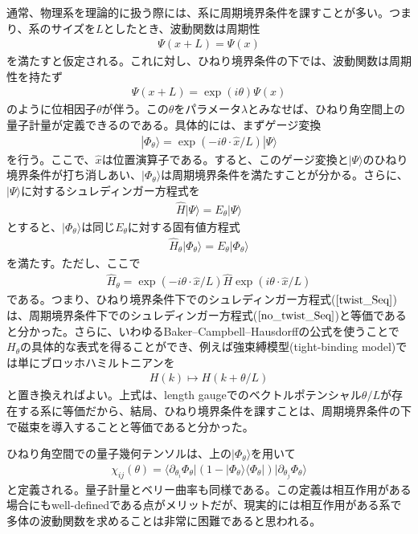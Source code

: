 \documentclass[12pt]{jsbook}
\newcommand{\la}{\langle}
\newcommand{\ra}{\rangle}
\newcommand{\pa}{\partial}
\begin{document}
通常、物理系を理論的に扱う際には、系に周期境界条件を課すことが多い。つまり、系のサイズを$L$としたとき、波動関数は周期性
\begin{eqnarray}
\Psi(x+L)=\Psi(x)
\end{eqnarray}
を満たすと仮定される。これに対し、ひねり境界条件の下では、波動関数は周期性を持たず
\begin{eqnarray}
\Psi(x+L)=\exp(i\theta)\Psi(x)
\end{eqnarray}
のように位相因子$\theta$が伴う。この$\theta$をパラメータ$\lambda$とみなせば、ひねり角空間上の量子計量が定義できるのである。具体的には、まずゲージ変換
\begin{eqnarray}
|\Phi_{\theta}\ra = \exp(-i\theta\cdot \hat{x}/L)|\Psi\ra
\end{eqnarray}
を行う。ここで、$\hat{x}$は位置演算子である。すると、このゲージ変換と$|\Psi\ra$のひねり境界条件が打ち消しあい、$|\Phi_{\theta}\ra$は周期境界条件を満たすことが分かる。さらに、$|\Psi\ra$に対するシュレディンガー方程式を
\begin{eqnarray}
\label{twist_Seq}
    \hat{H}|\Psi\ra = E_\theta|\Psi\ra
\end{eqnarray}
とすると、$|\Phi_{\theta}\ra$は同じ$E_\theta$に対する固有値方程式
\begin{eqnarray}
\label{no_twist_Seq}
    \hat{H}_\theta|\Phi_\theta\ra = E_\theta|\Phi_\theta\ra
\end{eqnarray}
を満たす。ただし、ここで
\begin{eqnarray}
    \hat{H}_\theta=\exp(-i\theta\cdot \hat{x}/L)\hat{H}\exp(i\theta\cdot \hat{x}/L)
\end{eqnarray}
である。つまり、ひねり境界条件下でのシュレディンガー方程式($\ref{twist_Seq}$)は、周期境界条件下でのシュレディンガー方程式($\ref{no_twist_Seq}$)と等価であると分かった。さらに、いわゆるBaker–Campbell–Hausdorffの公式を使うことで$H_\theta$の具体的な表式を得ることができ、例えば強束縛模型(tight-binding model)では単にブロッホハミルトニアンを
\begin{eqnarray}
    H(k)\mapsto H(k+\theta/L)
\end{eqnarray}
と置き換えればよい。上式は、length gaugeでのベクトルポテンシャル$\theta/L$が存在する系に等価だから、結局、ひねり境界条件を課すことは、周期境界条件の下で磁束を導入することと等価であると分かった。

ひねり角空間での量子幾何テンソルは、上の$|\Phi_\theta\ra$を用いて
\begin{eqnarray}
\label{twist_QGT}
\chi_{ij}(\theta)=\la \pa_{\theta_i} \Phi_\theta|(1-|\Phi_\theta\ra\la\Phi_\theta|)|\pa_{\theta_j}\Phi_\theta\ra 
\end{eqnarray}
と定義される。量子計量とベリー曲率も同様である。この定義は相互作用がある場合にもwell-definedである点がメリットだが、現実的には相互作用がある系で多体の波動関数を求めることは非常に困難であると思われる。
\end{document}
